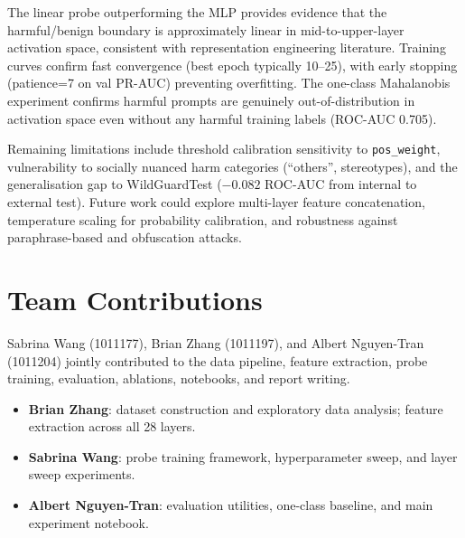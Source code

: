 \documentclass[11pt,a4paper]{article}
\begin{document}
The linear probe outperforming the MLP provides evidence that the harmful/benign
boundary is approximately linear in mid-to-upper-layer activation space, consistent
with representation engineering literature. Training curves confirm fast convergence
(best epoch typically 10--25), with early stopping (patience=7 on val PR-AUC)
preventing overfitting. The one-class Mahalanobis experiment confirms harmful prompts
are genuinely out-of-distribution in activation space even without any harmful training
labels (ROC-AUC 0.705).

Remaining limitations include threshold calibration sensitivity to \texttt{pos\_weight},
vulnerability to socially nuanced harm categories (``others'', stereotypes), and the
generalisation gap to WildGuardTest ($-0.082$ ROC-AUC from internal to external test).
Future work could explore multi-layer feature concatenation, temperature scaling for
probability calibration, and robustness against paraphrase-based and obfuscation attacks.

\section*{Team Contributions}
Sabrina Wang (1011177), Brian Zhang (1011197), and Albert Nguyen-Tran (1011204) jointly
contributed to the data pipeline, feature extraction, probe training, evaluation,
ablations, notebooks, and report writing.

\begin{itemize}[noitemsep]
  \item \textbf{Brian Zhang}: dataset construction and exploratory data analysis; feature extraction across all 28 layers.
  \item \textbf{Sabrina Wang}: probe training framework, hyperparameter sweep, and layer sweep experiments.
  \item \textbf{Albert Nguyen-Tran}: evaluation utilities, one-class baseline, and main experiment notebook.
\end{itemize}
\end{document}
